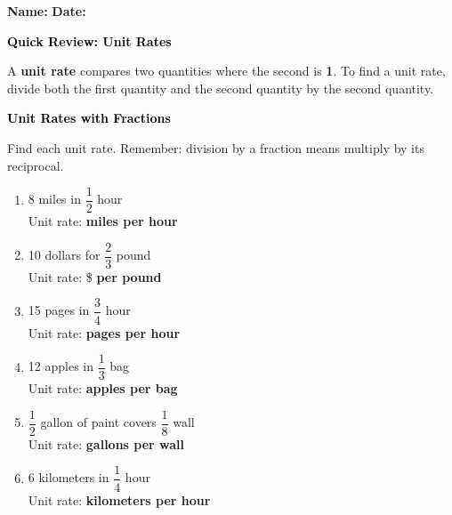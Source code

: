 \documentclass[12pt, letterpaper, fleqn]{article}
\newcommand{\blankshorter}{\underline{\hspace{1.5cm}}}
\begin{document}
\textbf{Name:} \underline{\hspace{5cm}}
\hfill
\textbf{Date:} \underline{\hspace{3cm}}\\

\begin{tcolorbox}[colback=customteal!20]
    \large\textcolor{black}{\textbf{Quick Review: Unit Rates}}
\end{tcolorbox}

\vspace{3mm}

\noindent
A \textbf{unit rate} compares two quantities where the second is \textbf{1}. To find a unit rate, divide both the first quantity and the second quantity by the second quantity.

\vspace{4mm}

\begin{tcolorbox}[colback=customteal!20]
\large\textcolor{black}{\textbf{Unit Rates with Fractions}}
\end{tcolorbox}

\noindent
Find each unit rate. Remember: division by a fraction means multiply by its reciprocal.

\vspace{3mm}

\begin{enumerate}[itemsep=1.4cm, leftmargin=0.6cm]
\item 8 miles in $\dfrac{1}{2}$ hour\\
Unit rate: \blankshorter \; \textbf{miles per hour}

\item 10 dollars for $\dfrac{2}{3}$ pound\\
Unit rate: \$ \blankshorter \; \textbf{per pound}

\item 15 pages in $\dfrac{3}{4}$ hour\\
Unit rate: \blankshorter \; \textbf{pages per hour}

\item 12 apples in $\dfrac{1}{3}$ bag\\
Unit rate: \blankshorter \; \textbf{apples per bag}

\item $\dfrac{1}{2}$ gallon of paint covers $\dfrac{1}{8}$ wall\\
Unit rate: \blankshorter \; \textbf{gallons per wall}

\item 6 kilometers in $\dfrac{1}{4}$ hour\\
Unit rate: \blankshorter \; \textbf{kilometers per hour}
\end{enumerate}
\end{document}
